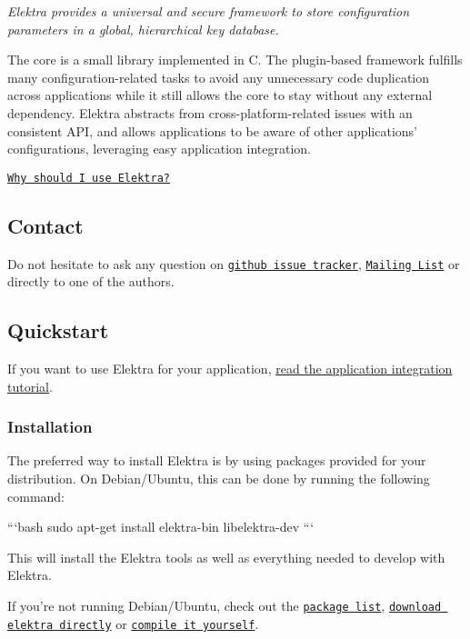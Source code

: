 {\itshape Elektra provides a universal and secure framework to store configuration parameters in a global, hierarchical key database.}



The core is a small library implemented in C. The plugin-\/based framework fulfills many configuration-\/related tasks to avoid any unnecessary code duplication across applications while it still allows the core to stay without any external dependency. Elektra abstracts from cross-\/platform-\/related issues with an consistent A\+P\+I, and allows applications to be aware of other applications' configurations, leveraging easy application integration.

\href{#goals}{\tt Why should I use Elektra?}

\subsection*{Contact}

Do not hesitate to ask any question on \href{https://github.com/ElektraInitiative/libelektra/issues}{\tt github issue tracker}, \href{https://lists.sourceforge.net/lists/listinfo/registry-list}{\tt Mailing List} or directly to one of the authors.

\subsection*{Quickstart}

If you want to use Elektra for your application, \hyperlink{doc_tutorials_application-integration_md}{read the application integration tutorial}.

\subsubsection*{Installation}

The preferred way to install Elektra is by using packages provided for your distribution. On Debian/\+Ubuntu, this can be done by running the following command\+:

```bash sudo apt-\/get install elektra-\/bin libelektra-\/dev ```

This will install the Elektra tools as well as everything needed to develop with Elektra.

If you're not running Debian/\+Ubuntu, check out the \href{#packages}{\tt package list}, \href{#download}{\tt download elektra directly} or \href{#compiling}{\tt compile it yourself}.

